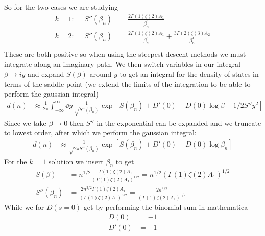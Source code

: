 \documentclass[a4paper,12pt]{article}
\begin{document}
So for the two cases we are studying 
\begin{equation}
	\begin{aligned}
	k=1:~~~~~~	S''(\beta_n)&=
		\frac{2\Gamma(1)\zeta(2)A_1}{\beta_n^{3}}\\
	k=2:~~~~~~S''(\beta_n)&=
	\frac{2\Gamma(1)\zeta(2)A_1}{\beta_n^{3}}+\frac{3\Gamma(2)\zeta(3)A_2}{\beta_n^{4}}\\
	\end{aligned}
\end{equation}
These are both positive so when using the steepest descent methods we must integrate along an imaginary path. We then switch variables in our integral $\beta\to iy$ and expand $S(\beta)$ around $y$ to get an integral for the density of states in terms of the saddle point (we extend the limits of the integration to be able to perform the gaussian integral)
\begin{equation}
	\begin{aligned}
		d(n)&\approx\frac{1}{2\pi }\int_{-\infty}^{\infty}\dd y\,\frac{1}{\sqrt{S''(\beta_n)}}\exp[S(\beta_n)+D'(0)-D(0)\log \beta-1/2 S''y^2]
	\end{aligned}
\end{equation}
Since we take $\beta\to 0$ then $S''$ in the exponential can be expanded and we truncate to lowest order, after which we perform the gaussian integral:
\begin{equation}
	\begin{aligned}
	d(n)&\approx\frac{1}{\sqrt{2\pi S''(\beta_n)}}\exp[S(\beta_n)+D'(0)-D(0)\log \beta_n]
	\end{aligned}
\end{equation}
For the $k=1$ solution we insert $\beta_n$ to get 
\begin{equation}
	\begin{aligned}
			S(\beta)&=n^{1/2}
		\frac{\Gamma(1)\zeta(2)A_1}{(\Gamma(1)\zeta(2)A_1)^{1/2}}=n^{1/2}
		(\Gamma(1)\zeta(2)A_1)^{1/2}\\
		S''(\beta_n)&=
		\frac{2n^{3/2}\Gamma(1)\zeta(2)A_1}{(\Gamma(1)\zeta(2)A_1)^{3/2}}=
		\frac{2n^{3/2}}{(\Gamma(1)\zeta(2)A_1)^{1/2}}
	\end{aligned}
\end{equation}
While we for $D(s=0)$ get by performing the binomial sum in mathematica
\begin{equation}
	\begin{aligned}
		D(0)&=-1\\
		D'(0)&=-1
	\end{aligned}
\end{equation}
\end{document}
